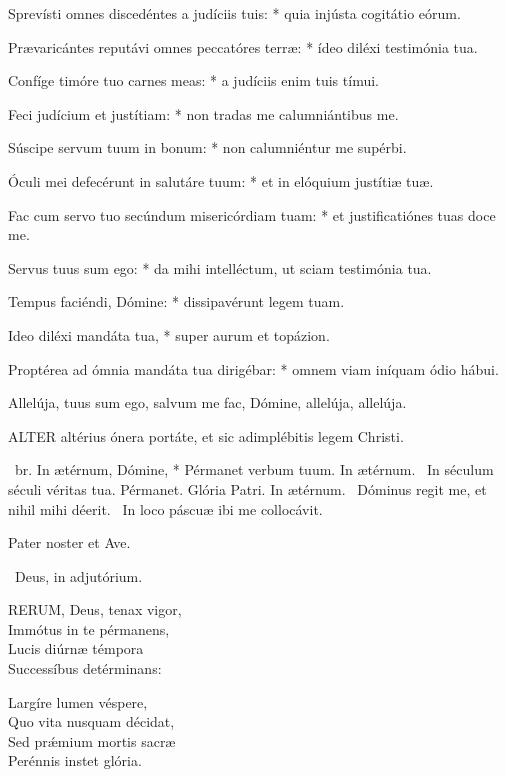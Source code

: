 Sprevísti omnes discedéntes a judíciis tuis: * quia injústa cogitátio eórum.

Prævaricántes reputávi omnes peccatóres terræ: * ídeo diléxi testimónia tua.

Confíge timóre tuo carnes meas: * a judíciis enim tuis tímui.

Feci judícium et justítiam: * non tradas me calumniántibus me.

Súscipe servum tuum in bonum: * non calumniéntur me supérbi.

Óculi mei defecérunt in salutáre tuum: * et in elóquium justítiæ tuæ.

Fac cum servo tuo secúndum misericórdiam tuam: * et justificatiónes tuas doce me.

Servus tuus sum ego: * da mihi intelléctum, ut sciam testimónia tua.

Tempus faciéndi, Dómine: * dissipavérunt legem tuam.

Ideo diléxi mandáta tua, * super aurum et topázion.

Proptérea ad ómnia mandáta tua dirigébar: * omnem viam iníquam ódio hábui.


 Allelúja, tuus sum ego, salvum me fac, Dómine, allelúja, allelúja.


\lettrine[lines=2]{A}{LTER} altérius ónera portáte, et sic adimplébitis legem Christi.

\R\ br. In ætérnum, Dómine, * Pérmanet verbum tuum. In ætérnum. \V\ In séculum séculi véritas tua. Pérmanet. Glória Patri. In ætérnum. \V\ Dóminus regit me, et nihil mihi déerit. \R\ In loco páscuæ ibi me collocávit.



\sectionornament


Pater noster et Ave.

\V\ Deus, in adjutórium.


\lettrine[lines=2]{R}{ERUM}, Deus, tenax vigor,\\
Immótus in te pérmanens,\\
Lucis diúrnæ témpora\\
Successíbus detérminans:

Largíre lumen véspere,\\
Quo vita nusquam décidat,\\
Sed prǽmium mortis sacræ\\
Perénnis instet glória.

